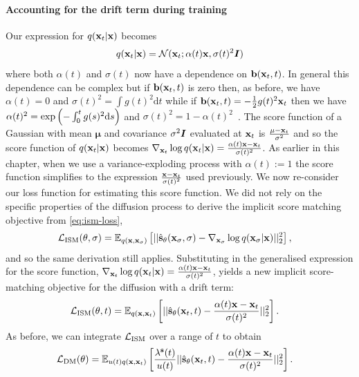 \paragraph{Accounting for the drift term during training}
Our expression for $q({\mathbf{x}}_t|{\mathbf{x}})$ becomes
\begin{align} \label{eq:vp-diffusion-q-noising}
    q({\mathbf{x}}_t|{\mathbf{x}}) = {\mathcal{N}}({\mathbf{x}}_t; \alpha(t){\mathbf{x}}, \sigma(t)^2{\bm{I}})
\end{align}
where both $\alpha(t)$ and $\sigma(t)$ now have a dependence on ${\mathbf{b}}({\mathbf{x}}_t, t)$. In general this dependence can be complex but if ${\mathbf{b}}({\mathbf{x}}_t, t)$ is zero then, as before, we have $\alpha(t) = 0$ and $\sigma(t)^2 = \int g(t)^2 \mathrm{d}t$ while if ${\mathbf{b}}({\mathbf{x}}_t, t) = - \frac{1}{2}g(t)^2{\mathbf{x}}_t$ then we have $\alpha(t)^2 = \text{exp}\left( - \int_0^t g(s)^2 \mathrm{d} s \right)$ and $\sigma(t)^2 = 1 - \alpha(t)^2$~\citep{song2020score}. The score function of a Gaussian with mean $\mathbf{\mu}$ and covariance $\sigma^2{\bm{I}}$ evaluated at ${\mathbf{x}}_t$ is $\frac{\mathbf{\mu} - {\mathbf{x}}_t}{\sigma^2}$ and so the score function of $q({\mathbf{x}}_t|{\mathbf{x}})$ becomes $\nabla_{{\mathbf{x}}_t} \log q({\mathbf{x}}_t|{\mathbf{x}}) = \frac{\alpha(t){\mathbf{x}} - {\mathbf{x}}_t}{\sigma(t)^2}$. As earlier in this chapter, when we use a variance-exploding process with $\alpha(t) := 1$ the score function simplifies to the expression $\frac{{\mathbf{x}}-{\mathbf{x}}_t}{\sigma(t)^2}$ used previously. We now re-consider our loss function for estimating this score function. We did not rely on the specific properties of the diffusion process to derive the implicit score matching objective from \cref{eq:ism-loss},
\begin{align} \label{eq:ism-loss-with-drift}
    \mathcal{L}_\text{ISM}(\theta, \sigma) &= \mathbb{E}_{q({\mathbf{x}}, {\mathbf{x}}_\sigma)} \left[ 
    || \hat{{\mathbf{s}}}_\theta({\mathbf{x}}_\sigma, \sigma) - \nabla_{{\mathbf{x}}_\sigma} \log q({\mathbf{x}}_\sigma|{\mathbf{x}}) ||_2^2 \right],
\end{align}
and so the same derivation still applies. Substituting in the generalised expression for the score function, $\nabla_{{\mathbf{x}}_t} \log q({\mathbf{x}}_t|{\mathbf{x}}) = \frac{\alpha(t){\mathbf{x}} - {\mathbf{x}}_t}{\sigma(t)^2}$, yields a new implicit score-matching objective for the diffusion with a drift term:
\begin{align}
    \mathcal{L}_\text{ISM}(\theta, t) &= \mathbb{E}_{q({\mathbf{x}}, {\mathbf{x}}_t)} \left[ || \hat{{\mathbf{s}}}_\theta({\mathbf{x}}_t, t) - \frac{\alpha(t){\mathbf{x}} - {\mathbf{x}}_t}{\sigma(t)^2} ||_2^2 \right].
\end{align}
As before, we can integrate ${\mathcal{L}}_\text{ISM}$ over a range of $t$ to obtain
\begin{align} \label{eq:general-dm-loss}
    \mathcal{L}_\text{DM}(\theta) &= \mathbb{E}_{u(t)q({\mathbf{x}}, {\mathbf{x}}_t)} \left[ \frac{\lambda^{\mathbf{s}}(t)}{u(t)} || \hat{{\mathbf{s}}}_\theta({\mathbf{x}}_t, t) - \frac{\alpha(t) {\mathbf{x}}-{\mathbf{x}}_t}{\sigma(t)^2} ||_2^2 \right].
\end{align}

